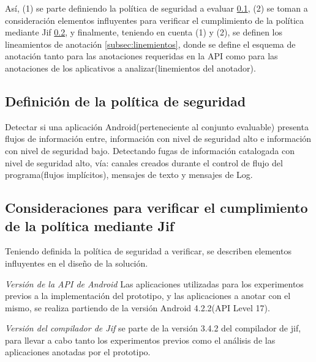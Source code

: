 Así, (1) se parte definiendo la política de seguridad a evaluar
\ref{subsection:politica}, (2) se toman a consideración elementos influyentes
para verificar el cumplimiento de la política mediante Jif
\ref{subsec:consVerPol}, y finalmente, teniendo en cuenta (1) y (2), se definen
los lineamientos de anotación \ref{subsec:linemientos}, donde se define el
esquema de anotación tanto para las anotaciones requeridas en la API como para las anotaciones de los
aplicativos a analizar(linemientos del anotador).

\subsection{Definición de la política de seguridad}
\label{subsection:politica}
Detectar si una aplicación Android(perteneciente al conjunto evaluable) presenta
flujos de información entre, información con nivel de seguridad alto e
información con nivel de seguridad bajo.\newline
Detectando fugas de información catalogada con nivel de seguridad alto, vía:
canales creados durante el control de flujo del programa(flujos implícitos),
mensajes de texto y mensajes de Log.\newline 

\subsection{Consideraciones para verificar el cumplimiento de la política
mediante Jif} 
\label{subsec:consVerPol}
Teniendo definida la política de seguridad a verificar, se describen
elementos influyentes en el diseño de la solución.

\textit{Versión de la API de Android}\newline
Las aplicaciones utilizadas para los experimentos previos a la implementación
del prototipo, y las aplicaciones a anotar con el mismo, se realiza partiendo de
la versión Android 4.2.2(API Level 17).

\textit{Versión del compilador de Jif}\newline
se parte de la versión 3.4.2 del compilador de jif, para llevar a cabo tanto los
experimentos previos como el análisis de las aplicaciones anotadas por el prototipo.

